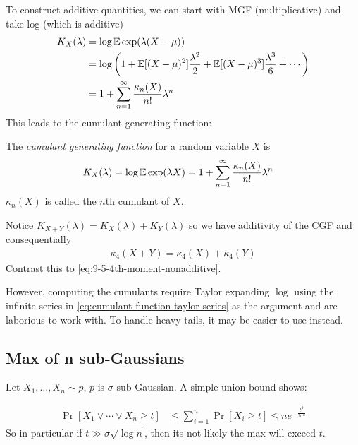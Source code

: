 To construct additive quantities, we can start with MGF (multiplicative)
and take log (which is additive)
\begin{align}
    K_X(\lambda)
    &= \log \mathbb{E} \exp(\lambda (X - \mu)) \\
    &= \log\left(
        1 + \mathbb{E}[(X - \mu)^2] \frac{\lambda^2}{2} + \mathbb{E}[(X - \mu)^3] \frac{\lambda^3}{6} + \cdots
    \right) \label{eq:cumulant-function-taylor-series} \\
    &= 1 + \sum_{n=1}^\infty \frac{\kappa_n(X)}{n!}\lambda^n 
\end{align}
This leads to the cumulant generating function:
\begin{definition}[Cumulants]
    The \emph{cumulant generating function} for a random variable $X$ is
    \begin{align}
        K_X(\lambda) &= \log \mathbb{E} \exp(\lambda X) = 1 + \sum_{n=1}^\infty \frac{\kappa_n(X)}{n!}\lambda^n 
    \end{align}
    $\kappa_n(X)$ is called the $n$th cumulant of $X$.
\end{definition}
Notice $K_{X + Y}(\lambda) = K_X(\lambda) + K_Y(\lambda)$ so we have additivity of the CGF and consequentially
\begin{align}
    \kappa_4(X + Y) = \kappa_4(X) + \kappa_4(Y)
\end{align}
Contrast this to \cref{eq:9-5-4th-moment-nonadditive}.

However, computing the cumulants require Taylor expanding $\log$ using the infinite
series in \cref{eq:cumulant-function-taylor-series} as the argument and are laborious to work with.
To handle heavy tails, it may be easier to use  instead.

\subsection{Max of n sub-Gaussians}

Let $X_1, \ldots, X_n \sim p$, $p$ is $\sigma$-sub-Gaussian. A simple union bound shows:
\begin{theorem}\label{thm:max-sub-gaussian}
    \begin{align}
        \Pr[X_1 \lor \cdots \lor X_n \geq t]
        &\leq \sum_{i=1}^n \Pr[X_i \geq t]
        \leq n e^{-\frac{t^2}{2 \sigma^2}}
    \end{align}
    So in particular if $t \gg \sigma \sqrt{\log n}$, then its not likely the max will exceed $t$.
\end{theorem}